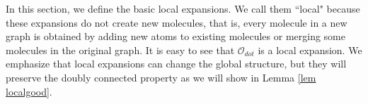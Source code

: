 \documentclass{article}
\newcommand{\1}{\mathds{1}}
\numberwithin{equation}{section}
\newcommand{\be}{\begin{equation}}
\newcommand{\ee}{\end{equation}}
\renewcommand{\cal}{\mathcal}
\theoremstyle{plain} %
\theoremstyle{remark}
\begin{document}
In this section, we define the basic local expansions. We call them ``local" because these expansions do not create new molecules, that is, every molecule in a new graph is obtained by adding new atoms to existing molecules or merging some molecules in the original graph.
It is easy to see that $\cal O_{dot}$ is a local expansion. We emphasize that local expansions can change the global structure, but they will preserve the doubly connected property as we will show in Lemma \ref{lem localgood}.
\end{document}
